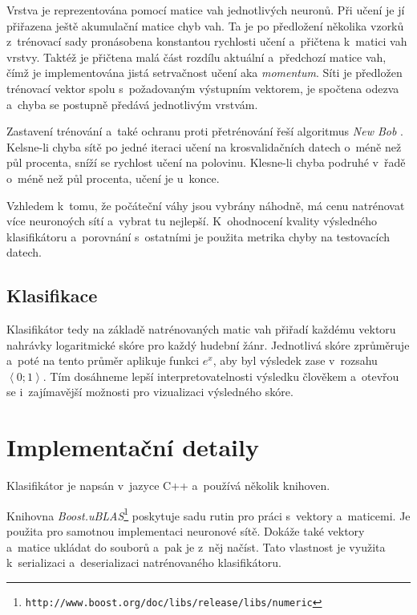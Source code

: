 \documentclass[10pt,a4paper]{article}
\begin{document}
Vrstva je reprezentována pomocí matice vah jednotlivých neuronů.
Při učení je jí přiřazena ještě akumulační matice chyb vah.
Ta je po předložení několika vzorků z~trénovací sady
pronásobena konstantou rychlosti učení a~přičtena k~matici vah vrstvy.
Taktéž je přičtena malá část rozdílu aktuální a~předchozí matice vah,
čímž je implementována jistá setrvačnost učení aka \emph{momentum}.
Síti je předložen trénovací vektor spolu s~požadovaným výstupním vektorem,
je spočtena odezva a~chyba se postupně předává jednotlivým vrstvám.

Zastavení trénování a~také ochranu proti přetrénování řeší algoritmus \emph{New Bob} \cite{newbob}.
Kelsne-li chyba sítě po jedné iteraci učení na krosvalidačních datech o~méně než půl procenta,
sníží se rychlost učení na polovinu. Klesne-li chyba podruhé v~řadě o~méně než půl procenta,
učení je u~konce.

Vzhledem k~tomu, že počáteční váhy jsou vybrány náhodně,
má cenu natrénovat více neuronoých sítí a~vybrat tu nejlepší.
K~ohodnocení kvality výsledného klasifikátoru a~porovnání s~ostatními
je použita metrika chyby na testovacích datech.

\subsection{Klasifikace}

Klasifikátor tedy na základě natrénovaných matic vah přiřadí každému vektoru nahrávky logaritmické skóre pro každý
hudební žánr. Jednotlivá skóre zprůměruje a~poté na tento průměr aplikuje funkci $e^x$,
aby byl výsledek zase v~rozsahu $\left<0; 1\right>$.
Tím dosáhneme lepší interpretovatelnosti výsledku člověkem a~otevřou se i~zajímavější možnosti pro vizualizaci
výsledného skóre.

\section{Implementační detaily}
\label{impl}

Klasifikátor je napsán v~jazyce C++ a~používá několik knihoven.

Knihovna \emph{Boost.uBLAS}\footnote{\texttt{http://www.boost.org/doc/libs/release/libs/numeric}}
poskytuje sadu rutin pro práci s~vektory a~maticemi.
Je použita pro samotnou implementaci neuronové sítě.
Dokáže také vektory a~matice ukládat do souborů a~pak je z~něj načíst.
Tato vlastnost je využita k~serializaci a~deserializaci natrénovaného klasifikátoru.
\end{document}
